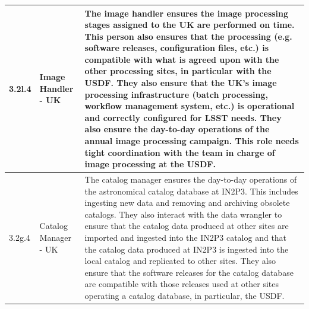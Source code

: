 \begin{longtable} {|p{}|p{}|p{}|}
{3.2l.4}&{Image Handler - UK}&{The image handler ensures the image processing stages assigned to the UK are performed on time. This person also ensures that the processing (e.g. software releases, configuration files, etc.) is compatible with what is agreed upon with the other processing sites, in particular with the USDF. They also ensure that the UK's image processing infrastructure (batch processing, workflow management system, etc.) is operational and correctly configured for LSST needs. They also ensure the day-to-day operations of the annual image processing campaign. This role needs tight coordination with the team in charge of image processing at the USDF.} \\ \hline
{3.2g.4}&{Catalog Manager - UK}&{The catalog manager ensures the day-to-day operations of the astronomical catalog database at IN2P3. This includes ingesting new data and removing and archiving obsolete catalogs. They also interact with the data wrangler to ensure that the catalog data produced at other sites are imported and ingested into the IN2P3 catalog and that the catalog data produced at IN2P3 is ingested into the local catalog and replicated to other sites. They also ensure that the software releases for the catalog database are compatible with those releases used at other sites operating a catalog database, in particular, the USDF.} \\ \hline
\end{longtable} \normalsize
